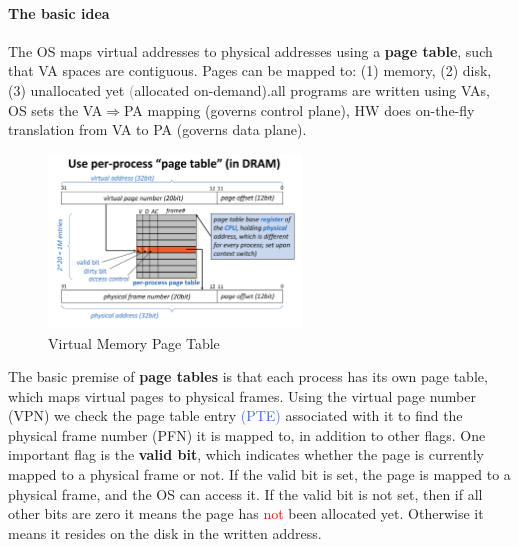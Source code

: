 \documentclass[openany,12pt]{book}
\newcommand{\red}[1]{\textcolor{Red}{#1}}
\newcommand{\blue}[1]{\textcolor{RoyalBlue}{#1}}
\newcommand{\gray}[1]{\textcolor{gray}{#1}}
\begin{document}
\paragraph{The basic idea} The OS maps virtual addresses to physical addresses using a \textbf{page table}, such that VA spaces are contiguous. Pages can be mapped to: (1) memory, (2) disk, (3) unallocated yet \gray(allocated on-demand).all programs are written using VAs, OS sets the VA\(\Longrightarrow\)PA mapping (governs control plane), HW does on-the-fly translation from VA to PA (governs data plane). 


\begin{figure}[h!]
  \centering
  \includegraphics[width=0.6\textwidth]{page-table.png}
  \caption{Virtual Memory Page Table}
\end{figure}


The basic premise of \textbf{page tables} is that each process has its own page table, which maps virtual pages to physical frames. Using the virtual page number (VPN) we check the page table entry \blue{(PTE)} associated with it to find the physical frame number (PFN) it is mapped to, in addition to other flags. One important flag is the \textbf{valid bit}, which indicates whether the page is currently mapped to a physical frame or not. If the valid bit is set, the page is mapped to a physical frame, and the OS can access it. If the valid bit is not set, then if all other bits are zero it means the page has \red{not} been allocated yet. Otherwise it means it resides on the disk in the written address. 
\end{document}
